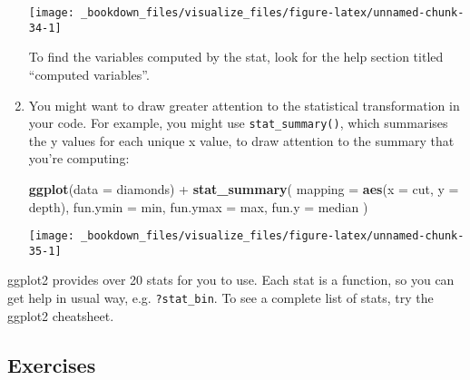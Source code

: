\documentclass[]{book}
\newenvironment{Shaded}{\begin{snugshade}}{\end{snugshade}}
\newcommand{\KeywordTok}[1]{\textcolor[rgb]{0.13,0.29,0.53}{\textbf{{#1}}}}
\newcommand{\DataTypeTok}[1]{\textcolor[rgb]{0.13,0.29,0.53}{{#1}}}
\newcommand{\StringTok}[1]{\textcolor[rgb]{0.31,0.60,0.02}{{#1}}}
\newcommand{\NormalTok}[1]{{#1}}
\begin{document}
\begin{enumerate}
  \begin{center}\texttt{[image: \_bookdown\_files/visualize\_files/figure-latex/unnamed-chunk-34-1]} \end{center}

  To find the variables computed by the stat, look for the help section
  titled ``computed variables''.
\item
  You might want to draw greater attention to the statistical
  transformation in your code. For example, you might use
  \texttt{stat\_summary()}, which summarises the y values for each
  unique x value, to draw attention to the summary that you're
  computing:

\begin{Shaded}
\begin{Highlighting}[]
\KeywordTok{ggplot}\NormalTok{(}\DataTypeTok{data =} \NormalTok{diamonds) +}\StringTok{ }
\StringTok{  }\KeywordTok{stat_summary}\NormalTok{(}
    \DataTypeTok{mapping =} \KeywordTok{aes}\NormalTok{(}\DataTypeTok{x =} \NormalTok{cut, }\DataTypeTok{y =} \NormalTok{depth),}
    \DataTypeTok{fun.ymin =} \NormalTok{min,}
    \DataTypeTok{fun.ymax =} \NormalTok{max,}
    \DataTypeTok{fun.y =} \NormalTok{median}
  \NormalTok{)}
\end{Highlighting}
\end{Shaded}

  \begin{center}\texttt{[image: \_bookdown\_files/visualize\_files/figure-latex/unnamed-chunk-35-1]} \end{center}
\end{enumerate}

ggplot2 provides over 20 stats for you to use. Each stat is a function,
so you can get help in usual way, e.g. \texttt{?stat\_bin}. To see a
complete list of stats, try the ggplot2 cheatsheet.

\subsection{Exercises}\label{exercises-4}
\end{document}
